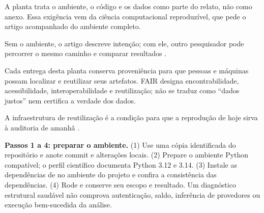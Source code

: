 A planta trata o ambiente, o c\'odigo e os dados como parte do relato, n\~ao como anexo. Essa exig\^encia vem da ci\^encia computacional reproduz\'ivel, que pede o artigo acompanhado do ambiente completo.

Sem o ambiente, o artigo descreve inten\c{c}\~ao; com ele, outro pesquisador pode percorrer o mesmo caminho e comparar resultados .

Cada entrega desta planta conserva proveniência para que pessoas e máquinas
possam localizar e reutilizar seus artefatos. FAIR designa encontrabilidade,
acessibilidade, interoperabilidade e reutilização; não se traduz como
``dados justos'' nem certifica a verdade dos dados.

A infraestrutura de reutiliza\c{c}\~ao \'e a condi\c{c}\~ao para que a reprodu\c{c}\~ao de hoje sirva \`a auditoria de amanh\~a .


\begin{descricao}
\textbf{Passos 1 a 4: preparar o ambiente.} (1) Use uma cópia identificada do
repositório e anote commit e alterações locais. (2) Prepare o ambiente Python
compatível; o perfil científico documenta Python 3.12 e 3.14. (3) Instale as
dependências de  no ambiente do
projeto e confira a consistência das dependências. (4) Rode
 e conserve seu escopo e resultado.
Um diagnóstico estrutural saudável não comprova autenticação, saldo,
inferência de provedores ou execução bem-sucedida da análise.
\end{descricao}

